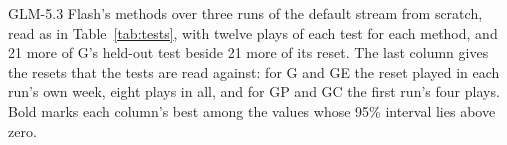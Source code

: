 \begin{table}[htbp]
\centering
\footnotesize\setlength{\tabcolsep}{3pt}

\caption{GLM-5.3 Flash's methods over three runs of the default stream from scratch, read as in Table~\ref{tab:tests}, with twelve plays of each test for each method, and 21 more of G's held-out test beside 21 more of its reset. The last column gives the resets that the tests are read against: for G and GE the reset played in each run's own week, eight plays in all, and for GP and GC the first run's four plays. Bold marks each column's best among the values whose 95\% interval lies above zero.}
\label{tab:sweep-runs}
\end{table}
